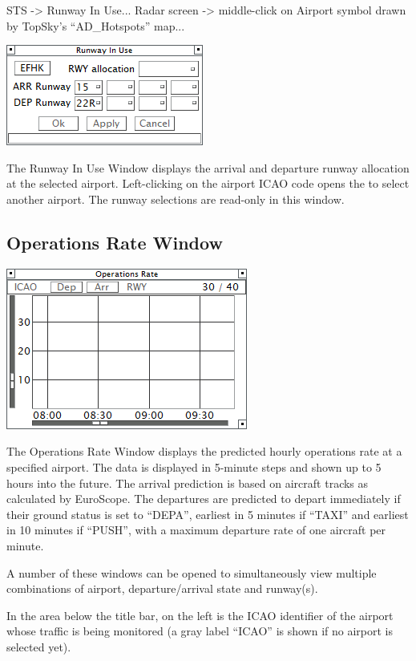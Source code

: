 \documentclass[11pt,a4paper]{memoir}
\begin{document}
\textit{} STS -> Runway In Use...
Radar screen -> middle-click on Airport symbol drawn by TopSky’s “AD\_Hotspots” map...

\includegraphics{img/rwy.png}

The Runway In Use Window displays the arrival and departure runway allocation at the selected airport. Left-clicking on the airport ICAO code opens the \textit{} to select another airport. The runway selections are read-only in this window.

\subsection{Operations Rate Window}
\label{win:orw}

\includegraphics{img/opsrate.png}

The Operations Rate Window displays the predicted hourly operations rate at a specified airport. The data is displayed in 5-minute steps and shown up to 5 hours into the future. The arrival prediction is based on aircraft tracks as calculated by EuroScope. The departures are predicted to depart immediately if their ground status is set to “DEPA”, earliest in 5 minutes if “TAXI” and earliest in 10 minutes if “PUSH”, with a maximum departure rate of one aircraft per minute.

A number of these windows can be opened to simultaneously view multiple combinations of airport, departure/arrival state and runway(s).

In the area below the title bar, on the left is the ICAO identifier of the airport whose traffic is being monitored (a gray label “ICAO” is shown if no airport is selected yet).
\end{document}
